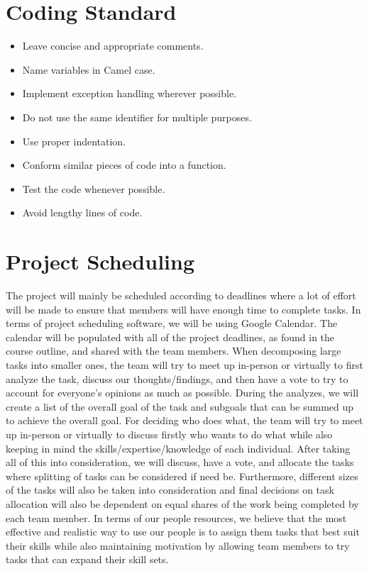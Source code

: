 \documentclass{article}
\begin{document}
\section{Coding Standard}
\begin{itemize}
	\item Leave concise and appropriate comments.
	\item Name variables in Camel case.
	\item Implement exception handling wherever possible.
	\item Do not use the same identifier for multiple purposes.
	\item Use proper indentation.
	\item Conform similar pieces of code into a function.
	\item Test the code whenever possible.
	\item Avoid lengthy lines of code.
\end{itemize}
\section{Project Scheduling}

The project will mainly be scheduled according to deadlines where a lot of effort
will be made to ensure that members will have enough time to complete tasks.
In terms of project scheduling software, we will be using Google Calendar.
The calendar will be populated with all of the project deadlines, as found in the
course outline, and shared with the team members. When decomposing large
tasks into smaller ones, the team will try to meet up in-person or virtually to
first analyze the task, discuss our thoughts/findings, and then have a vote to try
to account for everyone’s opinions as much as possible. During the analyzes, we
will create a list of the overall goal of the task and subgoals that can be summed
up to achieve the overall goal. For deciding who does what, the team will try to
meet up in-person or virtually to discuss firstly who wants to do what while also
keeping in mind the skills/expertise/knowledge of each individual. After taking
all of this into consideration, we will discuss, have a vote, and allocate the tasks
where splitting of tasks can be considered if need be. Furthermore, different
sizes of the tasks will also be taken into consideration and final decisions on task
allocation will also be dependent on equal shares of the work being completed by
each team member. In terms of our people resources, we believe that the most
effective and realistic way to use our people is to assign them tasks that best
suit their skills while also maintaining motivation by allowing team members to
try tasks that can expand their skill sets.
\end{document}
